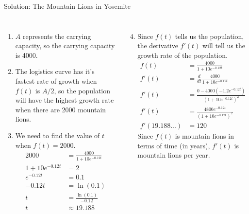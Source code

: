 \documentclass[10pt,aspectratio=1610,xcolor={dvipsnames}]{beamer}
\begin{document}
  \begin{frame}{Solution: The Mountain Lions in Yosemite}

    \begin{columns}

      \begin{enumerate}
        \item{
          $A$ represents the carrying capacity, so the carrying capacity is 4000.
        }
        \item{
          The logistics curve has it's fastest rate of growth when $f(t)$ is $A / 2$, so the population will have the highest growth rate when there are 2000 mountain lions.
        }
        \item{
          We need to find the value of $t$ when $f(t) = 2000$.
          \begin{align*}
            2000 &= \frac{4000}{1 + 10e^{-0.12t}} \\
            1 + 10e^{-0.12t} &= 2 \\
            e^{-0.12t} &= 0.1 \\
            -0.12t &= \ln(0.1) \\
            t &= \frac{\ln(0.1)}{-0.12} \\
            t &\approx 19.188
          \end{align*}
        }
      \end{enumerate}

      \begin{enumerate}
        \setcounter{enumi}{3}
        \item{
          Since $f(t)$ tells us the population, the derivative $f'(t)$ will tell us the growth rate of the population.
          \begin{align*}
            f(t) &= \frac{4000}{1 + 10e^{-0.12t}} \\
            f'(t) &= \frac{d}{dt} \frac{4000}{1 + 10e^{-0.12t}} \\
            f'(t) &= \frac{0 - 4000(-1.2e^{-0.12t})}{(1 + 10e^{-0.12t})^2} \\
            f'(t) &= \frac{4800e^{-0.12t}}{(1 + 10e^{-0.12t})^2} \\
            f'(19.188...) &= 120
          \end{align*}
          Since $f(t)$ is mountain lions in terms of time (in years), $f'(t)$ is mountain lions per year.
        }
      \end{enumerate}

    \end{columns}

  \end{frame}
\end{document}

